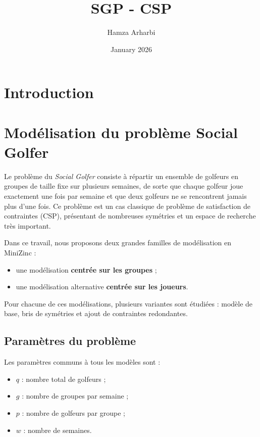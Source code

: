 \documentclass{article}
\title{SGP - CSP}
\author{Hamza Arharbi}
\date{January 2026}
\begin{document}
\maketitle
\tableofcontents
\newpage

\section{Introduction}



\section{Modélisation du problème Social Golfer}

Le problème du \emph{Social Golfer} consiste à répartir un ensemble de golfeurs en groupes de taille fixe sur plusieurs semaines, de sorte que chaque golfeur joue exactement une fois par semaine et que deux golfeurs ne se rencontrent jamais plus d’une fois.
Ce problème est un cas classique de problème de satisfaction de contraintes (CSP), présentant de nombreuses symétries et un espace de recherche très important.

Dans ce travail, nous proposons deux grandes familles de modélisation en MiniZinc :
\begin{itemize}
    \item une modélisation \textbf{centrée sur les groupes} ;
    \item une modélisation alternative \textbf{centrée sur les joueurs}.
\end{itemize}

Pour chacune de ces modélisations, plusieurs variantes sont étudiées : modèle de base, bris de symétries et ajout de contraintes redondantes.

\subsection{Paramètres du problème}

Les paramètres communs à tous les modèles sont :
\begin{itemize}
    \item $q$ : nombre total de golfeurs ;
    \item $g$ : nombre de groupes par semaine ;
    \item $p$ : nombre de golfeurs par groupe ;
    \item $w$ : nombre de semaines.
\end{itemize}
\end{document}
